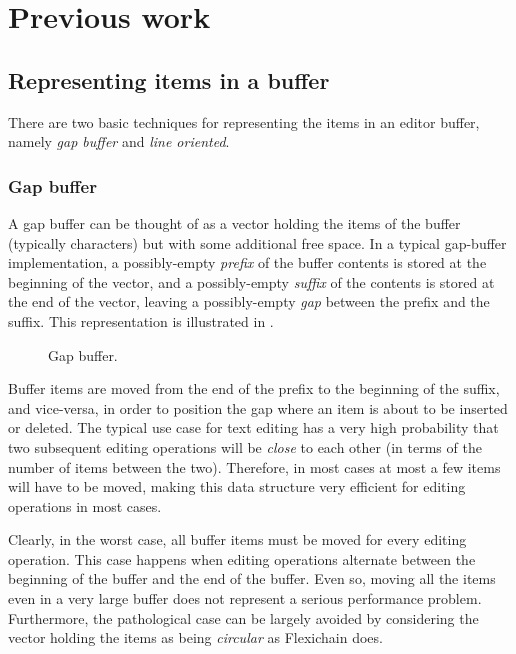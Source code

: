 \section{Previous work}
\label{sec-previous-work}

\subsection{Representing items in a buffer}

There are two basic techniques for representing the items in an editor
buffer, namely \emph{gap buffer} and \emph{line oriented}.

\subsubsection{Gap buffer}
\label{sec-previous-gap-buffer}

A gap buffer can be thought of as a vector holding the items of the
buffer (typically characters) but with some additional free space.  In
a typical gap-buffer implementation, a possibly-empty \emph{prefix} of
the buffer contents is stored at the beginning of the vector, and a
possibly-empty \emph{suffix} of the contents is stored at the end of
the vector, leaving a possibly-empty \emph{gap} between the prefix and
the suffix.  This representation is illustrated in
.

\begin{figure}
\begin{center}
\end{center}
\caption{\label{fig-gap-buffer}
Gap buffer.}
\end{figure}

Buffer items are moved from the end of the prefix to the beginning of
the suffix, and vice-versa, in order to position the gap where an item
is about to be inserted or deleted.  The typical use case for text
editing has a very high probability that two subsequent editing
operations will be \emph{close} to each other (in terms of the number
of items between the two).  Therefore, in most cases at most a few
items will have to be moved, making this data structure very
efficient for editing operations in most cases.

Clearly, in the worst case, all buffer items must be moved for every
editing operation.  This case happens when editing operations
alternate between the beginning of the buffer and the end of the
buffer.  Even so, moving all the items even in a very large buffer
does not represent a serious performance problem.  Furthermore, the
pathological case can be largely avoided by considering the vector
holding the items as being \emph{circular} as Flexichain
\cite{flexichain} does.

